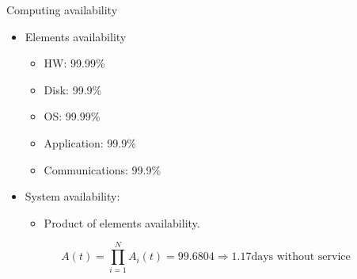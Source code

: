 \begin{frame}{Computing availability}
\begin{itemize}
  \item Elements availability
    \begin{itemize}
      \item HW: 99.99\%
      \item Disk: 99.9\%
      \item OS: 99.99\%
      \item Application: 99.9\%
      \item Communications: 99.9\%
    \end{itemize}

  \item System availability:
    \begin{itemize}
      \item Product of elements availability.
    \end{itemize}
\end{itemize}
\begin{equation*}
A(t) = \prod_{i=1}^{N} A_i(t) = 99.6804 \Rightarrow 1.17 \text{days without service}
\end{equation*}
\end{frame}

